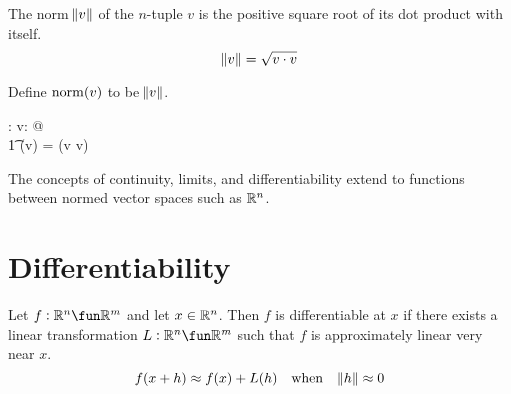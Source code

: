 \documentclass[11pt, oneside]{article}
\begin{document}
The norm $\norm{v}$ of the $n$-tuple $v$ is the positive square root of its dot product with itself.
$$
	\norm{v} = \sqrt{v \mathbin{\cdot} v}
$$

Define $\operatorname{norm}(v)$ to be $\norm{v}$.
\begin{axdef}
	\normR: \Rinf \fun \R
\where
	\forall v: \Rinf @ \\
	\t1	\normR(v) = \sqrtR(v \dotR v)
\end{axdef}

The concepts of continuity, limits, and differentiability extend to functions between normed vector spaces such as $\mathbb{R}^n$.

\section{Differentiability}

Let $f: \R^n \fun \R^m$ and let $x \in \mathbb{R}^n$.
Then $f$ is differentiable at $x$ if there exists a linear transformation $L: \R^n \fun \R^m$
such that $f$ is approximately linear very near $x$.
$$
f(x + h) \approx f(x) + L(h) \quad \text{when} \quad \norm{h} \approx 0
$$ 

\printbibliography
\end{document}
